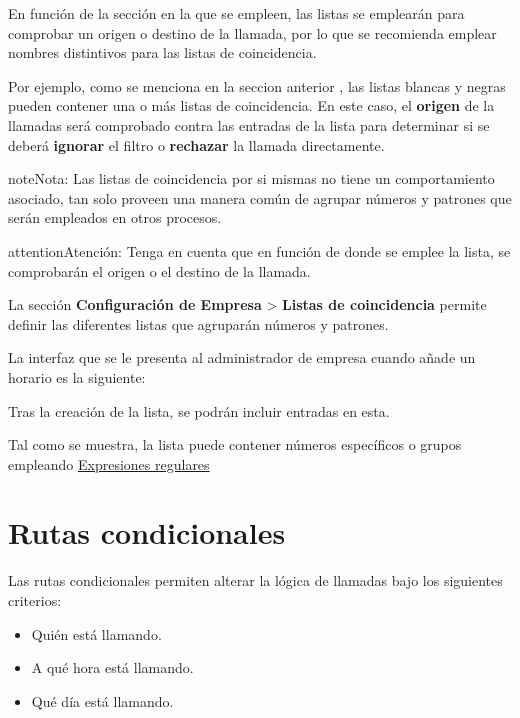 \documentclass[letterpaper,10pt,spanish]{sphinxmanual}
\begin{document}
En función de la sección en la que se empleen, las listas se emplearán para comprobar un origen o destino de la llamada, por lo que se recomienda emplear nombres distintivos para las listas de coincidencia.

Por ejemplo, como se menciona en la seccion anterior {\hyperref[pbx_features/external_filters:external\string-filters]{}}, las listas blancas y negras pueden contener una o más listas de coincidencia. En este caso, el \textbf{origen} de la llamadas será comprobado contra las entradas de la lista para determinar si se deberá \textbf{ignorar} el filtro o \textbf{rechazar} la llamada directamente.

\begin{notice}{note}{Nota:}
Las listas de coincidencia por si mismas no tiene un comportamiento asociado, tan solo proveen una manera común de agrupar números y patrones que serán empleados en otros procesos.
\end{notice}

\begin{notice}{attention}{Atención:}
Tenga en cuenta que en función de donde se emplee la lista, se comprobarán el origen o el destino de la llamada.
\end{notice}

La sección \textbf{Configuración de Empresa} \textgreater{} \textbf{Listas de coincidencia} permite definir las diferentes listas que agruparán números y patrones.

La interfaz que se le presenta al administrador de empresa cuando añade un horario es la siguiente:


Tras la creación de la lista, se podrán incluir entradas en esta.


Tal como se muestra, la lista puede contener números específicos o grupos empleando \href{http://php.net/manual/en/reference.pcre.pattern.syntax.php}{Expresiones regulares}


\section{Rutas condicionales}
\label{pbx_features/conditional_routes::doc}\label{pbx_features/conditional_routes:conditional-routes}\label{pbx_features/conditional_routes:id1}
Las rutas condicionales permiten alterar la lógica de llamadas bajo los siguientes criterios:
\begin{itemize}
\item {} 
Quién está llamando.

\item {} 
A qué hora está llamando.

\item {} 
Qué día está llamando.

\end{itemize}
\end{document}
